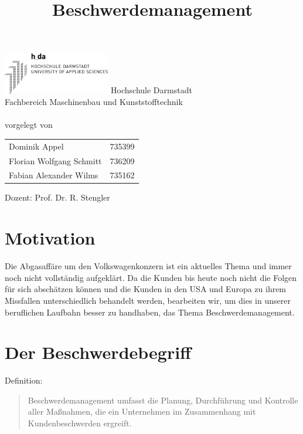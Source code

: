 \documentclass[a4paper,12pt]{article}
\title{Beschwerdemanagement}
\begin{document}
	\pagestyle{empty}
	\begin{center}
		\includegraphics[width=0.35\textwidth]{fig/Logo/h-da-logo-sw.pdf}
		\vfill
		\Large Hochschule Darmstadt \\
		\vspace{12pt}
		Fachbereich Maschinenbau und Kunststofftechnik \normalsize \\
		\vfill
		\makeatletter
		\Large\@title \\
		\normalsize
		\vfill
		vorgelegt von \\
		\vspace{12pt}
		\begin{tabular}[h]{lr}
			Dominik Appel & 735399 \\
			Florian Wolfgang Schmitt & 736209 \\
			Fabian Alexander Wilms & 735162 \\
		\end{tabular}
		\makeatother
		\vfill
		Dozent: Prof. Dr. R. Stengler\\
	\end{center}
	\newpage
	\pagestyle{plain}
	\tableofcontents
	\newpage
	\section*{Motivation}
	Die Abgasaffäre um den Volkswagenkonzern ist ein aktuelles Thema und immer noch nicht vollständig aufgeklärt. Da die Kunden bis heute noch nicht die Folgen für sich abschätzen können und die Kunden in den USA und Europa zu ihrem Missfallen unterschiedlich behandelt werden, bearbeiten wir, um dies in unserer beruflichen Laufbahn besser zu handhaben, das Thema Beschwerdemanagement.
	\section{Der Beschwerdebegriff}
	\begin{center}
		Definition:
	\end{center}
	\blockquote{Beschwerdemanagement umfasst die Planung, Durchführung und Kontrolle aller Maßnahmen, die ein Unternehmen im Zusammenhang mit Kundenbeschwerden ergreift.} {\cite{Gabler}} \\
	
\end{document}

